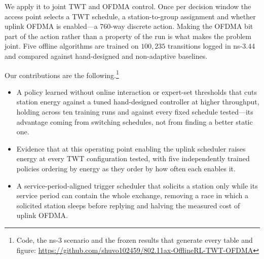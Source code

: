We apply it to joint TWT and OFDMA control. Once per decision window the
access point selects a TWT schedule, a station-to-group assignment and whether
uplink OFDMA is enabled---a 760-way discrete action. Making the OFDMA bit part
of the action rather than a property of the run is what makes the problem
joint. Five offline algorithms are trained on $100{,}235$ transitions logged in
ns-3.44 and compared against hand-designed and non-adaptive baselines.

Our contributions are the following.\footnote{Code, the ns-3 scenario and the
frozen results that generate every table and figure:
\url{https://github.com/shuvo102459/802.11ax-OfflineRL-TWT-OFDMA}}
\begin{itemize}
\item A policy learned without online interaction or expert-set thresholds that
cuts station energy against a tuned hand-designed controller at higher
throughput, holding across ten training runs and against every fixed schedule
tested---its advantage coming from switching schedules, not from finding a
better static one.
\item Evidence that at this operating point enabling the uplink scheduler
raises energy at every TWT configuration tested, with five independently trained
policies ordering by energy as they order by how often each enables it.
\item A service-period-aligned trigger scheduler that solicits a station only
while its service period can contain the whole exchange, removing a race in
which a solicited station sleeps before replying and halving the measured cost
of uplink OFDMA.
\end{itemize}
